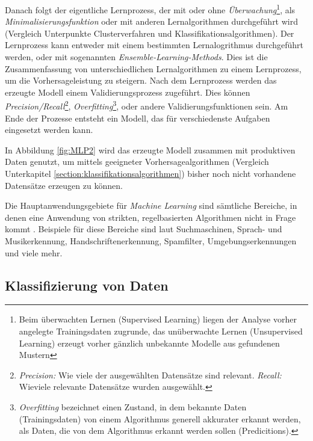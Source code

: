 Danach folgt der eigentliche Lernprozess, der mit oder ohne \textit{Überwachung}\footnote{Beim überwachten Lernen (Supervised Learning) liegen der Analyse vorher angelegte Trainingsdaten zugrunde, das unüberwachte Lernen (Unsupervised Learning) erzeugt vorher gänzlich unbekannte Modelle aus gefundenen Mustern }, als \textit{Minimalisierungsfunktion} oder mit anderen Lernalgorithmen durchgeführt wird (Vergleich Unterpunkte Clusterverfahren und Klassifikationsalgorithmen). Der Lernprozess kann entweder mit einem bestimmten Lernalogrithmus durchgeführt werden, oder mit sogenannten \textit{Ensemble-Learning-Methods}. Dies ist die Zusammenfassung von unterschiedlichen Lernalgorithmen zu einem Lernprozess, um die Vorhersageleistung zu steigern. Nach dem Lernprozess werden das erzeugte Modell einem Validierungsprozess zugeführt. Dies können \textit{Precision/Recall}\footnote{\textit{Precision:} Wie viele der ausgewählten Datensätze sind relevant. \textit{Recall:} Wieviele relevante Datensätze wurden ausgewählt. }, \textit{Overfitting}\footnote{\textit{Overfitting} bezeichnet einen Zustand, in dem bekannte Daten (Trainingsdaten) von einem Algorithmus generell akkurater erkannt werden, als Daten, die von dem Algorithmus erkannt werden sollen (Predicitions).}, oder andere Validierungsfunktionen sein. Am Ende der Prozesse entsteht ein Modell, das für verschiedenste Aufgaben eingesetzt werden kann. 

In Abbildung \ref{fig:MLP2} wird das erzeugte Modell zusammen mit produktiven Daten genutzt, um mittels geeigneter Vorhersagealgorithmen (Vergleich Unterkapitel \ref{section:klassifikationsalgorithmen}) bisher noch nicht vorhandene Datensätze erzeugen zu können.  

Die Hauptanwendungsgebiete für \textit{Machine Learning} sind sämtliche Bereiche, in denen eine Anwendung von strikten, regelbasierten Algorithmen nicht in Frage kommt . Beispiele für diese Bereiche sind laut  Suchmaschinen, Sprach- und Musikerkennung, Handschriftenerkennung, Spamfilter, Umgebungserkennungen und viele mehr. 



\subsection{Klassifizierung von Daten}
\label{section:klassifizierung von daten}


